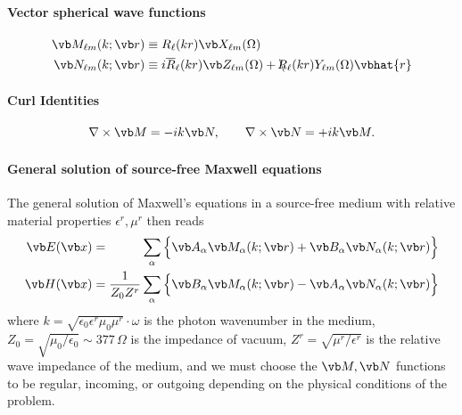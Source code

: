 \documentclass[letterpaper]{article}
\newcommand{\lm}{_{\ell m}}
\newcommand{\RBar}{\overline{R}}
\newcommand{\RSlash}{\backslash\hspace{-0.08in}R}
\begin{document}
\paragraph{Vector spherical wave functions}
\begin{subequations} 
\begin{align} 
 \vb M\lm(k; \vb r) 
&\equiv R_\ell(kr) \vb X\lm(\Omega) 
\\
 \vb N\lm(k; \vb r) &\equiv 
i\RBar_\ell(kr) \vb Z\lm(\Omega) + \RSlash_\ell(kr) Y\lm(\Omega) \vbhat{r} 
\end{align} 
\label{MNDef}%
\end{subequations} 

\paragraph{Curl Identities}

$$ \nabla \times \vb M = -ik\vb N, \qquad
   \nabla \times \vb N = +ik\vb M.
$$

\paragraph{General solution of source-free Maxwell equations}

The general solution of Maxwell's equations in a source-free
medium with relative material properties $\epsilon^r, \mu^r$ 
then reads
\begin{subequations}
\begin{align}
 \vb E(\vb x)
 &= \hphantom{\frac{1}{Z_0 Z^r}} \sum_\alpha 
     \Big\{ \vb A_\alpha \vb M_\alpha(k; \vb r)
           +\vb B_\alpha \vb N_\alpha(k; \vb r)
     \Big\} 
\\
 \vb H(\vb x)
 &= \frac{1}{Z_0 Z^r} \sum_\alpha 
     \Big\{ \vb B_\alpha \vb M_\alpha(k; \vb r)
           -\vb A_\alpha \vb N_\alpha(k; \vb r)
     \Big\} 
\end{align}
\label{EHExpansion}%
\end{subequations}
where $k=\sqrt{\epsilon_0 \epsilon^r \mu_0 \mu^r}\cdot \omega$
is the photon wavenumber in the medium,
$Z_0=\sqrt{\mu_0/\epsilon_0}\sim 377\,\Omega$ is the impedance
of vacuum,
$Z^r=\sqrt{\mu^r/\epsilon^r}$ is the relative wave impedance
of the medium, and we must choose the $\vb M, \vb N$ 
functions to be regular, incoming, or outgoing depending
on the physical conditions of the problem.
\end{document}
